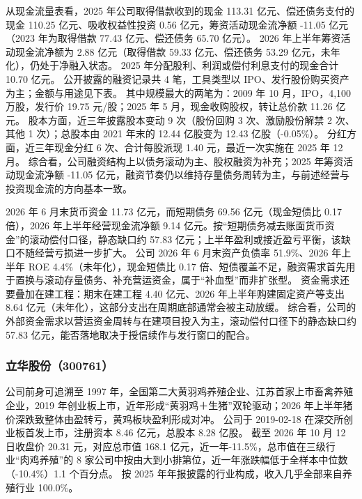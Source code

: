  从现金流量表看，2025 年公司取得借款收到的现金 113.31 亿元、偿还债务支付的现金 110.25 亿元、吸收权益性投资 0.56 亿元，筹资活动现金流净额 -11.05 亿元（2023 年为取得借款 77.43 亿元、偿还债务 65.70 亿元）。 2026 年上半年筹资活动现金流净额为 2.88 亿元（取得借款 59.33 亿元、偿还债务 53.29 亿元，未年化），仍处于净融入状态。 2025 年分配股利、利润或偿付利息支付的现金合计 10.70 亿元。 公开披露的融资记录共 4 笔，工具类型以 IPO、发行股份购买资产为主；金额与用途见下表。 其中规模最大的两笔为：2009 年 10 月，IPO，4,100 万股，发行价 19.75 元/股；2025 年 5 月，现金收购股权，转让总价款 11.26 亿元。 股本方面，近三年披露股本变动 9 次（股份回购 3 次、激励股份解禁 2 次、其他 1 次）；总股本由 2021 年末的 12.44 亿股变为 12.43 亿股（-0.05\%）。 分红方面，近三年现金分红 6 次、合计每股派现 1.40 元，最近一次实施在 2025 年 12 月。 综合看，公司融资结构上以债务滚动为主、股权融资为补充；2025 年筹资活动现金流净额 -11.05 亿元，融资节奏仍以维持存量债务周转为主，与前述经营与投资现金流的方向基本一致。

 2026 年 6 月末货币资金 11.73 亿元，而短期债务 69.56 亿元（现金短债比 0.17 倍），2026 年上半年经营现金流净额 9.14 亿元。按“短期债务减去账面货币资金”的滚动偿付口径，静态缺口约 57.83 亿元；上半年盈利或接近盈亏平衡，该缺口不随经营亏损进一步扩大。 公司 2026 年 6 月末资产负债率 51.9\%、2026 年上半年 ROE 4.4\%（未年化），现金短债比 0.17 倍、短债覆盖不足，融资需求首先用于置换与滚动存量债务、补充营运资金，属于“补血型”而非扩张型。 资金需求还要叠加在建工程：期末在建工程 4.40 亿元、2026 年上半年购建固定资产等支出 8.64 亿元（未年化），这部分支出在周期底部通常会被主动放缓。 综合看，公司的外部资金需求以营运资金周转与在建项目投入为主，滚动偿付口径下的静态缺口约 57.83 亿元，能否落地取决于授信续作与发行窗口的配合。




\subsubsection{立华股份（300761）}
\label{co:300761}

 公司前身可追溯至 1997 年，全国第二大黄羽鸡养殖企业、江苏首家上市畜禽养殖企业，2019 年创业板上市，近年形成“黄羽鸡＋生猪”双轮驱动；2026 年上半年猪价深跌致整体由盈转亏，黄鸡板块盈利形成对冲。 公司于 2019-02-18 在深交所创业板首发上市，注册资本 8.46 亿元，总股本 8.28 亿股。 截至 2026 年 10 月 12 日收盘价 20.31 元，对应总市值 168.1 亿元，近一年-11.5\%，总市值在三级行业“肉鸡养殖”的 8 家公司中按由大到小排第位，近一年涨跌幅低于全样本中位数（-10.4\%）1.1 个百分点。 按 2025 年年报披露的行业构成，收入几乎全部来自养殖行业 100.0\%。

